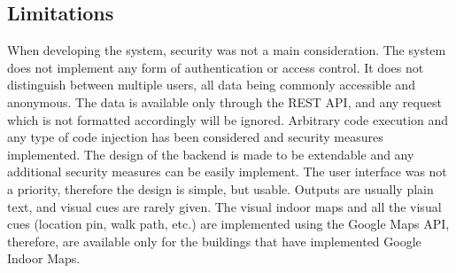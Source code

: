\subsection{Limitations}
When developing the system, security was not a main consideration. The system does not implement any form of authentication or access control. It does not distinguish between multiple users, all data being commonly accessible and anonymous. 
The data is available only through the REST API, and any request which is not formatted accordingly will be ignored. Arbitrary code execution and any type of code injection has been considered and security measures implemented.
The design of the backend is made to be extendable and any additional security measures can be easily implement.
The user interface was not a priority, therefore the design is simple, but usable. Outputs are usually plain text, and visual cues are rarely given. 
The visual indoor maps and all the visual cues (location pin, walk path, etc.) are implemented using the Google Maps API, therefore, are available only for the buildings that have implemented Google Indoor Maps.





